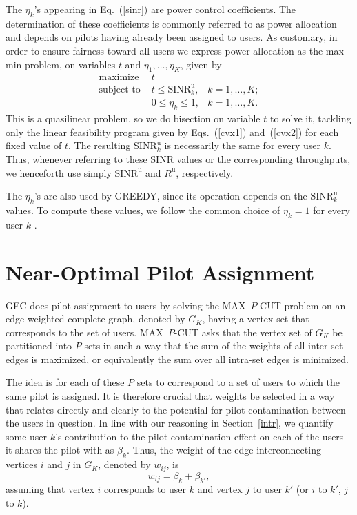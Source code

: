 \documentclass[]{IEEEtran}
\begin{document}
The $\eta_k$'s appearing in Eq.~(\ref{sinr}) are power control coefficients.
The determination of these coefficients is commonly referred to as power
allocation and depends on pilots having already been assigned to users. As
customary, in order to ensure fairness toward all users we express power
allocation as the max-min problem, on variables $t$ and $\eta_1,\ldots,\eta_K$,
given by
\begin{align}
\text{maximize } &t \\
\text{subject to }
&t\le\mathrm{SINR}_k^\mathrm{u}, &k=1,\ldots,K;
\label{cvx1} \\
&0\le\eta_k\le 1, &k=1,\ldots,K.
\label{cvx2}
\end{align}
This is a quasilinear problem, so we do bisection on variable $t$ to solve it,
tackling only the linear feasibility program given by Eqs.~(\ref{cvx1})
and~(\ref{cvx2}) for each fixed value of $t$. The resulting
$\mathrm{SINR}_k^\mathrm{u}$ is necessarily the same for every user $k$. Thus,
whenever referring to these SINR values or the corresponding throughputs, we
henceforth use simply $\mathrm{SINR^u}$ and $R^\mathrm{u}$, respectively.

The $\eta_k$'s are also used by GREEDY, since its operation depends on the
$\mathrm{SINR}_k^\mathrm{u}$ values. To compute these values, we follow the
common choice of $\eta_k=1$ for every user $k$ \cite{naylm17}.

\section{Near-Optimal Pilot Assignment}
\label{alg}

GEC does pilot assignment to users by solving the MAX~$P$-CUT problem on an
edge-weighted complete graph, denoted by $G_K$, having a vertex set that
corresponds to the set of users. MAX~$P$-CUT asks that the vertex set of $G_K$
be partitioned into $P$ sets in such a way that the sum of the weights of all
inter-set edges is maximized, or equivalently the sum over all intra-set edges
is minimized.

The idea is for each of these $P$ sets to correspond to a set of users to which
the same pilot is assigned. It is therefore crucial that weights be selected in
a way that relates directly and clearly to the potential for pilot contamination
between the users in question. In line with our reasoning in Section~\ref{intr},
we quantify some user $k$'s contribution to the pilot-contamination effect on
each of the users it shares the pilot with as $\beta_k$. Thus, the weight of the
edge interconnecting vertices $i$ and $j$ in $G_K$, denoted by $w_{ij}$, is
\begin{equation}
w_{ij}=\beta_k+\beta_{k'},
\label{weight-init}
\end{equation}
assuming that vertex $i$ corresponds to user $k$ and vertex $j$ to user $k'$ (or
$i$ to $k'$, $j$ to $k$).
\end{document}
